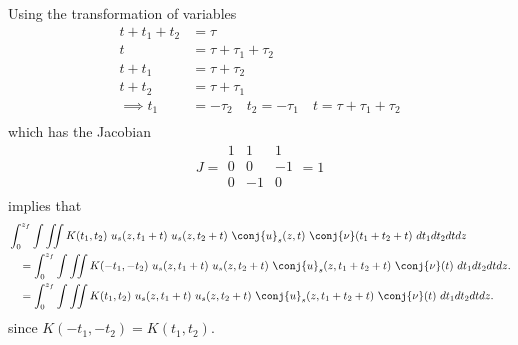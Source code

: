 Using the transformation of variables
\begin{equation}
\begin{split}
t + t_1 + t_2 &= \tau  \\
 t &= \tau + \tau_1 + \tau_2 \\
 t + t_1 &= \tau + \tau_2 \\
 t + t_2 &= \tau + \tau_1 \\
\implies t_1 &= -\tau_2 \quad t_2 = -\tau_1 \quad  t = \tau + \tau_1 + \tau_2 \\
\end{split}
\end{equation}
which has the Jacobian 
\begin{displaymath}
J = \begin{array}{|ccc|}
1 & 1 & 1 \\ 
0 & 0 & -1  \\ 
0 & -1 & 0 \\
\end{array}= 1
\end{displaymath}
implies that
\begin{equation}
 \begin{split}
&\int_{0}^{z_f} \int  \iint K(t_1,t_2) \ u_s(z,t_1+t)\ u_s(z,t_2+t)\  \conj{u}_s(z,t)\  \conj{\nu}(t_1+t_2+t) \ dt_1 dt_2 dt dz  \\
&\quad= \int_{0}^{z_f} \int \iint K(-t_1,-t_2) \ u_s(z,t_1+t)\ u_s(z,t_2+t)\ \conj{u}_s(z,t_1+t_2+t)\ \conj{\nu}(t) \ dt_1 dt_2 dt dz. \\
&\quad= \int_{0}^{z_f} \int \iint K(t_1,t_2)\ u_s(z,t_1+t)\ u_s(z,t_2+t)\ \conj{u}_s(z,t_1+t_2+t)\ \conj{\nu}(t)  \ dt_1 dt_2 dt dz. \\
\end{split}
\end{equation}
since $ K(-t_1,-t_2) =  K(t_1,t_2)$.

